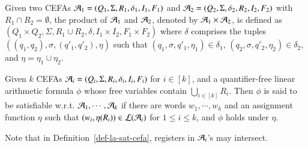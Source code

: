 
Given two CEFAs $\mathcal{A}_1 = ( Q_1, \Sigma, R_1, \delta_1, I_1, F_1)$ and $\mathcal{A}_2 = (Q_2, \Sigma, \delta_2, R_2, I_2, F_2)$ with $R_1 \cap R_2 = \emptyset$,  the product of $\mathcal{A}_1$ and $\mathcal{A}_2$, denoted by $\mathcal{A}_1 \times \mathcal{A}_2$, is defined as $(Q_1 \times Q_2, \Sigma, R_1 \cup R_2, \delta, I_1 \times I_2, F_1 \times F_2)$ where $\delta$ comprises the tuples $((q_1, q_2), \sigma, (q'_1, q'_2), \eta)$ such that $(q_1, \sigma, q'_1, \eta_1) \in \delta_1$, $(q_2, \sigma, q'_2, \eta_2) \in \delta_2$, and $\eta = \eta_1\cup \eta_2$.  %


\begin{definition}\label{def-la-sat-cefa}
	Given $k$ CEFAs $\mathcal{A}_i=(Q_i, \Sigma, R_i, \delta_i, I_i, F_i)$ for $i\in [k]$, %
	and  a quantifier-free linear arithmetic formula $\phi$ 
	whose free variables contain $\bigcup_{i\in [k]} R_i$. Then $\phi$ is said to be satisfiable w.r.t. $\mathcal{A}_1, \cdots, \mathcal{A}_k$ if  there are words $w_1, \cdots, w_k$ and an assignment function $\eta$ %
	such that  $(w_i, \eta(R_i)) \in \mathcal{L}(\mathcal{A}_i)$ for $1\leq i\leq k$, and $\phi$ holds under $\eta$.
\end{definition}
Note that in Definition~\ref{def-la-sat-cefa}, registers in $\mathcal{A}_i$'s may intersect. %

